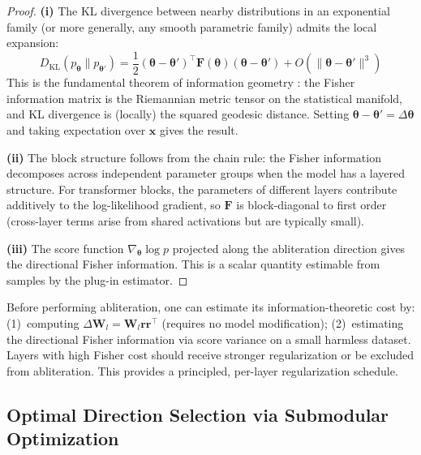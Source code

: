 \begin{proof}
\textbf{(i)} The KL divergence between nearby distributions in an exponential family (or more generally, any smooth parametric family) admits the local expansion:
\begin{equation}
    D_{\mathrm{KL}}(p_{\boldsymbol{\theta}} \| p_{\boldsymbol{\theta}'}) = \frac{1}{2}(\boldsymbol{\theta} - \boldsymbol{\theta}')^\top \mathbf{F}(\boldsymbol{\theta})(\boldsymbol{\theta} - \boldsymbol{\theta}') + O(\|\boldsymbol{\theta} - \boldsymbol{\theta}'\|^3)
\end{equation}
This is the fundamental theorem of information geometry \citep{amari2016information}: the Fisher information matrix is the Riemannian metric tensor on the statistical manifold, and KL divergence is (locally) the squared geodesic distance.
Setting $\boldsymbol{\theta} - \boldsymbol{\theta}' = \Delta\boldsymbol{\theta}$ and taking expectation over $\mathbf{x}$ gives the result.

\textbf{(ii)} The block structure follows from the chain rule: the Fisher information decomposes across independent parameter groups when the model has a layered structure.
For transformer blocks, the parameters of different layers contribute additively to the log-likelihood gradient, so $\mathbf{F}$ is block-diagonal to first order (cross-layer terms arise from shared activations but are typically small).

\textbf{(iii)} The score function $\nabla_{\boldsymbol{\theta}} \log p$ projected along the abliteration direction gives the directional Fisher information.
This is a scalar quantity estimable from samples by the plug-in estimator.
\end{proof}

\begin{corollary}
\label{cor:preabliteration}
Before performing abliteration, one can estimate its information-theoretic cost by:
(1)~computing $\Delta\mathbf{W}_l = \mathbf{W}_l\mathbf{r}\mathbf{r}^\top$ (requires no model modification);
(2)~estimating the directional Fisher information via score variance on a small harmless dataset.
Layers with high Fisher cost should receive stronger regularization or be excluded from abliteration.
This provides a principled, per-layer regularization schedule.
\end{corollary}

\subsection{Optimal Direction Selection via Submodular Optimization}
\label{app:submodular}

